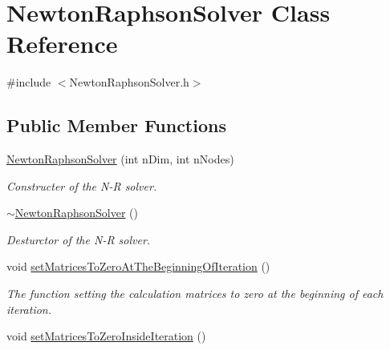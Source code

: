\hypertarget{classNewtonRaphsonSolver}{}\section{Newton\+Raphson\+Solver Class Reference}
\label{classNewtonRaphsonSolver}


{\ttfamily \#include $<$Newton\+Raphson\+Solver.\+h$>$}

\subsection*{Public Member Functions}
\begin{DoxyCompactItemize}
\item 
\hyperlink{classNewtonRaphsonSolver_a3cd02ecd63a37d6b621ece7f781aeefd}{Newton\+Raphson\+Solver} (int n\+Dim, int n\+Nodes)
\begin{DoxyCompactList}\small\item\em Constructer of the N-\/\+R solver. \end{DoxyCompactList}\item 
\hypertarget{classNewtonRaphsonSolver_a84bf8e492138670ee2a9355c65b35904}{}\hyperlink{classNewtonRaphsonSolver_a84bf8e492138670ee2a9355c65b35904}{$\sim$\+Newton\+Raphson\+Solver} ()\label{classNewtonRaphsonSolver_a84bf8e492138670ee2a9355c65b35904}

\begin{DoxyCompactList}\small\item\em Desturctor of the N-\/\+R solver. \end{DoxyCompactList}\item 
\hypertarget{classNewtonRaphsonSolver_a3d01456ea07e72b0f02ae2e8d2b8ec9e}{}void \hyperlink{classNewtonRaphsonSolver_a3d01456ea07e72b0f02ae2e8d2b8ec9e}{set\+Matrices\+To\+Zero\+At\+The\+Beginning\+Of\+Iteration} ()\label{classNewtonRaphsonSolver_a3d01456ea07e72b0f02ae2e8d2b8ec9e}

\begin{DoxyCompactList}\small\item\em The function setting the calculation matrices to zero at the beginning of each iteration. \end{DoxyCompactList}\item 
\hypertarget{classNewtonRaphsonSolver_a36d647a13f9942e90e288a42c5444c4d}{}void \hyperlink{classNewtonRaphsonSolver_a36d647a13f9942e90e288a42c5444c4d}{set\+Matrices\+To\+Zero\+Inside\+Iteration} ()\label{classNewtonRaphsonSolver_a36d647a13f9942e90e288a42c5444c4d}


\end{DoxyCompactItemize}
